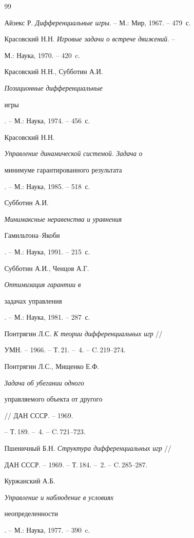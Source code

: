 \begin{thebibliography}{99}







Айзекс Р. {\em Дифференциальные игры}. -- М.: Мир, 1967. -- 479~с.




Красовский Н.Н. {\em Игровые задачи о встрече движений}. --


М.: Наука, 1970. -- 420~c.




Красовский Н.Н., Субботин А.И. {\em Позиционные дифференциальные


игры}. -- М.: Наука, 1974. -- 456~с.




Красовский Н.Н. {\em Управление динамической системой. Задача о 


минимуме гарантированного результата}. -- М.: Наука, 1985. -- 518~с.




Субботин А.И. {\em Минимаксные неравенства и уравнения


Гамильтона--Якоби}. -- М.: Наука, 1991. -- 215~с.




Субботин А.И., Ченцов А.Г. {\em Оптимизация гарантии в


задачах управления}. -- М.: Наука, 1981. -- 287~с.




Понтрягин Л.С. {\em К теории дифференциальных игр} //


УМН. -- 1966. -- Т.\,21. -- \No\,4. -- C.\,219--274.




Понтрягин Л.С., Мищенко Е.Ф. {\em Задача об убегании одного


управляемого объекта от другого} // ДАН СССР. -- 1969.


-- Т.\,189. -- \No\,4. -- C.\,721--723.




Пшеничный Б.Н. {\em Структура дифференциальных игр} //


ДАН СССР. -- 1969. -- Т.\,184. -- \No\,2. -- C.\,285--287.




Куржанский А.Б. {\em Управление и наблюдение в условиях


неопределенности}. -- М.: Наука, 1977. -- 390~c.



\end{thebibliography}
